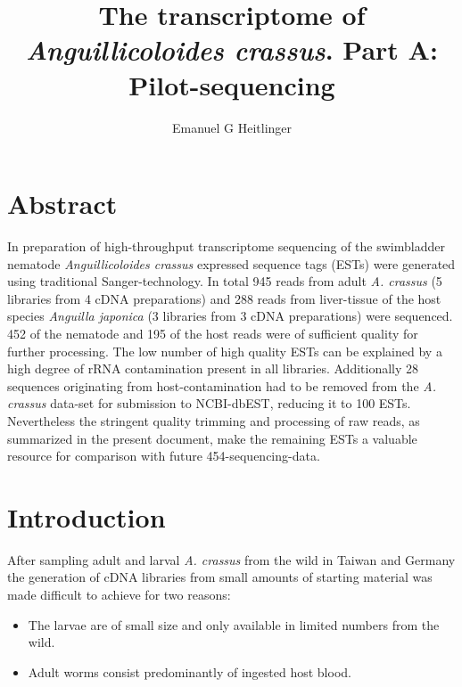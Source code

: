 \documentclass[12pt,a4paper]{article}
\begin{document}







\title{The transcriptome of \textit{Anguillicoloides crassus}. Part A:
  Pilot-sequencing} \author{Emanuel G Heitlinger} \date{}
\maketitle

\section*{Abstract}
In preparation of high-throughput transcriptome sequencing of the
swimbladder nematode \textit{Anguillicoloides crassus} expressed
sequence tags (ESTs) were generated using traditional
Sanger-technology. In total 945 reads from
adult \textit{A. crassus} (5 libraries from 4 cDNA preparations) and
288 reads from liver-tissue of the host
species \textit{Anguilla japonica} (3 libraries from 3 cDNA
preparations) were sequenced. 452 of the
nematode and 195 of the host reads were
of sufficient quality for further processing. The low number of high
quality ESTs can be explained by a high degree of rRNA contamination
present in all libraries. Additionally
28 sequences originating from
host-contamination had to be removed from the \textit{A. crassus}
data-set for submission to NCBI-dbEST, reducing it to
100 ESTs. Nevertheless the stringent
quality trimming and processing of raw reads, as summarized in the
present document, make the remaining ESTs a valuable resource for
comparison with future 454-sequencing-data.

\section*{Introduction}

After sampling adult and larval \textit{A. crassus} from the wild in
Taiwan and Germany the generation of cDNA libraries from small amounts
of starting material was made difficult to achieve for two reasons:
\begin{itemize}
\item The larvae are of small size and only available in limited
  numbers from the wild.
\item Adult worms consist predominantly of ingested host blood.
\end{itemize}
\end{document}
